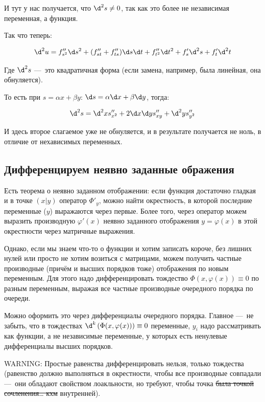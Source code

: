\documentclass[12pt, a4paper]{article}
\begin{document}
И тут у нас получается, что $\d^2 s \neq 0$, так как это более не независимая переменная, а функция.

Так что теперь:

\begin{equation}
  \d^2 u = f''_{s^2} \d s^2 + (f''_{st} + f''_{ts}) \d s \d t + f''_{t^2} \d t^2
  + f'_s \d^2 s + f'_t \d^2 t
\end{equation}

Где $\d^2 s$ — это квадратичная форма (если замена, например, была линейная, она обнуляется).

То есть при $s = \alpha x + \beta y$:
$\d s = \alpha \d x + \beta \d y$, тогда:

\begin{equation}
  \d^2 s = \d^2 x s''_{x^2} + 2 \d x \d y s''_{xy} + \d^2 y s''_{y^2}
\end{equation}

И здесь второе слагаемое уже не обнуляется, и в результате получается не ноль, в отличие от нехависимых переменных.



\subsection{Дифференцируем неявно заданные ображения}

Есть теорема о неявно заданном отображении: если функция достаточно гладкая и в точке $(x|y)$ оператор $\Phi'_y$, 
можно найти окрестность, в которой последние переменные ($y$) выражаются через первые. 
Более того, через оператор можем выразить производную $\varphi'(x)$ неявно заданного отображения $y = \varphi(x)$ в этой окрестности через матричные выражения.

Однако, если мы знаем что-то о функции и хотим записать короче, без лишних нулей 
или просто не хотим возиться с матрицами, можем получить частные производные (причём и высших порядков тоже)
отображения по новым переменным. Для этого надо дифференцировать тождество $\Phi(x, \varphi(x)) \equiv 0$ по разным переменным, 
выражая все частные производные очередного порядка по очереди.

Можно оформить это через дифференциалы очередного порядка. Главное — не забыть, что в тождествах $\d^k\left( \Phi(x, \varphi(x)) \right) \equiv 0$ 
переменные, $y_i$ надо рассматривать как функции, а не независимые переменные, у которых есть ненулевые дифференциалы высших порядков.

WARNING: Простые равенства дифференцировать нельзя, только тождества 
(равенство должно выполняться в окрестности, чтобы все производные совпадали — они обладают свойством лоакльности, но требуют, чтобы точка 
\sout{была точкой сочленения… кхм} внутренней).
\end{document}
